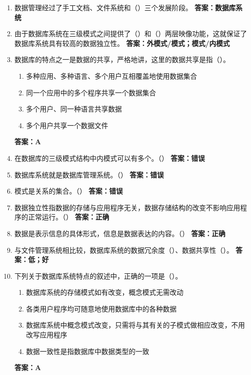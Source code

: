 \documentclass[12pt, a4paper]{article}
\begin{document}
\begin{enumerate}[label=\arabic*.]
	\item 数据管理经过了手工文档、文件系统和（\quad）三个发展阶段。
	      \textbf{答案：数据库系统}

	\item 由于数据库系统在三级模式之间提供了（\quad）和（\quad）两层映像功能，这就保证了数据库系统具有较高的数据独立性。
	      \textbf{答案：外模式/模式；模式/内模式}

	\item 数据库的特点之一是数据的共享，严格地讲，这里的数据共享是指（\quad）。
	      \begin{enumerate}
		      \item 多种应用、多种语言、多个用户互相覆盖地使用数据集合
		      \item 同一个应用中的多个程序共享一个数据集合
		      \item 多个用户、同一种语言共享数据
		      \item 多个用户共享一个数据文件
	      \end{enumerate}
	      \textbf{答案：A}

	\item 在数据库的三级模式结构中内模式可以有多个。（\quad）
	      \textbf{答案：错误}

	\item 数据库系统就是数据库管理系统。（\quad）
	      \textbf{答案：错误}

	\item 模式是关系的集合。（\quad）
	      \textbf{答案：错误}

	\item 数据独立性指数据的存储与应用程序无关，数据存储结构的改变不影响应用程序的正常运行。（\quad）
	      \textbf{答案：正确}

	\item 数据是表示信息的具体形式，信息是数据表达的内容。（\quad）
	      \textbf{答案：正确}

	\item 与文件管理系统相比较，数据库系统的数据冗余度（\quad）、数据共享性（\quad）。
	      \textbf{答案：低；好}

	\item 下列关于数据库系统特点的叙述中，正确的一项是（\quad）。
	      \begin{enumerate}
		      \item 数据库系统的存储模式如有改变，概念模式无需改动
		      \item 各类用户程序均可随意地使用数据库中的各种数据
		      \item 数据库系统中概念模式改变，只需将与其有关的子模式做相应改变，不用改写应用程序
		      \item 数据一致性是指数据库中数据类型的一致
	      \end{enumerate}
	      \textbf{答案：A}


\end{enumerate}
\end{document}
